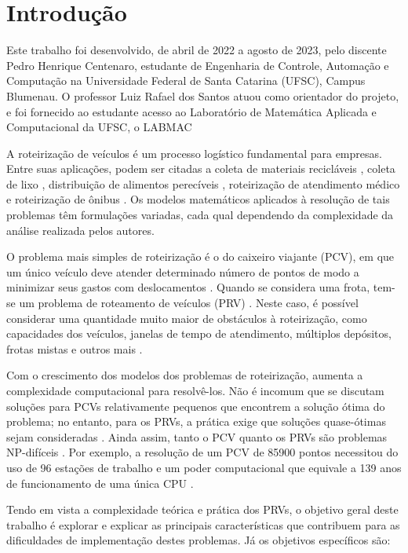 \section{Introdução}
Este trabalho foi desenvolvido, de abril de 2022 a agosto de 2023, pelo discente Pedro Henrique Centenaro, estudante de Engenharia de Controle, Automação e Computação na Universidade Federal de Santa Catarina (UFSC), Campus Blumenau. O professor Luiz Rafael dos Santos atuou como orientador do projeto, e foi fornecido ao estudante acesso ao Laboratório de Matemática Aplicada e Computacional da UFSC, o LABMAC

A roteirização de veículos é um processo logístico fundamental para empresas. Entre suas aplicações, podem ser citadas a coleta de materiais recicláveis \cite{BAPTISTA:02}, coleta de lixo \cite{MARKOVIC:20}, distribuição de alimentos perecíveis \cite{AMORIM:14}, roteirização de atendimento médico \cite{ISSABAKHSH:18} e roteirização de ônibus \cite{GUO:19}. Os modelos matemáticos aplicados à resolução de tais problemas têm formulações variadas, cada qual dependendo da complexidade da análise realizada pelos autores.

O problema mais simples de roteirização é o do caixeiro viajante (PCV), em que um único veículo deve atender determinado número de pontos de modo a minimizar seus gastos com deslocamentos \cite{OR-Tools,SAIYED:12,SIQUEIRA:22}. Quando se considera uma frota, tem-se um problema de roteamento de veículos (PRV) \cite{OR-Tools-VRP}. Neste caso, é possível considerar uma quantidade muito maior de obstáculos à roteirização, como capacidades dos veículos, janelas de tempo de atendimento, múltiplos depósitos, frotas mistas e outros mais \cite{VIEIRA:13,TORO:16}.

Com o crescimento dos modelos dos problemas de roteirização, aumenta a complexidade computacional para resolvê-los. Não é incomum que se discutam soluções para PCVs relativamente pequenos que encontrem a solução ótima do problema; no entanto, para os PRVs, a prática exige que soluções quase-ótimas sejam consideradas \cite{LAPORTE:87}. Ainda assim, tanto o PCV quanto os PRVs são problemas NP-difíceis \cite{ZAMBITO:06}. Por exemplo, a resolução de um PCV de 85900 pontos necessitou do uso de 96 estações de trabalho e um poder computacional que equivale a 139 anos de funcionamento de uma única CPU \cite{BAZRAFSHAN:21}.

Tendo em vista a complexidade teórica e prática dos PRVs, o objetivo geral deste trabalho é explorar e explicar as principais características que contribuem para as dificuldades de implementação destes problemas. Já os objetivos específicos são:

